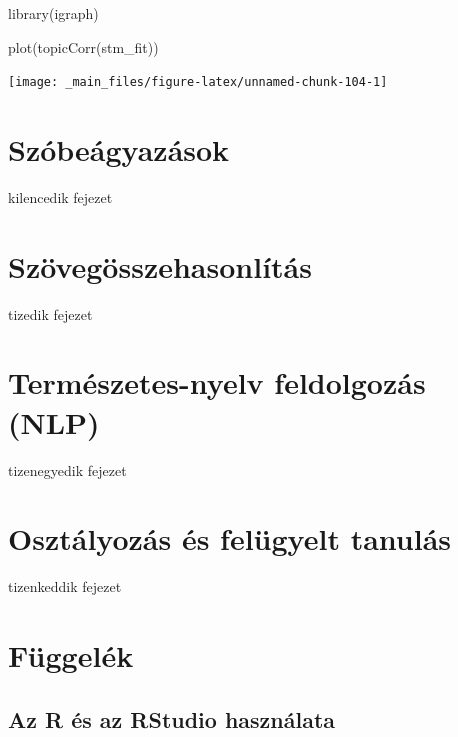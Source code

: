 \documentclass[
]{book}
\newenvironment{Shaded}{\begin{snugshade}}{\end{snugshade}}
\newcommand{\FunctionTok}[1]{\textcolor[rgb]{0.00,0.00,0.00}{#1}}
\newcommand{\NormalTok}[1]{#1}
\begin{document}
\begin{Shaded}
\begin{Highlighting}[]

\FunctionTok{library}\NormalTok{(igraph)}

\FunctionTok{plot}\NormalTok{(}\FunctionTok{topicCorr}\NormalTok{(stm\_fit))}
\end{Highlighting}
\end{Shaded}

\begin{center}\texttt{[image: \_main\_files/figure-latex/unnamed-chunk-104-1]} \end{center}

\hypertarget{szuxf3beuxe1gyazuxe1sok}{%
\chapter{Szóbeágyazások}\label{szuxf3beuxe1gyazuxe1sok}}

kilencedik fejezet

\hypertarget{szuxf6veguxf6sszehasonluxedtuxe1s}{%
\chapter{Szövegösszehasonlítás}\label{szuxf6veguxf6sszehasonluxedtuxe1s}}

tizedik fejezet

\hypertarget{termuxe9szetes-nyelv-feldolgozuxe1s-nlp}{%
\chapter{Természetes-nyelv feldolgozás
(NLP)}\label{termuxe9szetes-nyelv-feldolgozuxe1s-nlp}}

tizenegyedik fejezet

\hypertarget{osztuxe1lyozuxe1s-uxe9s-feluxfcgyelt-tanuluxe1s}{%
\chapter{Osztályozás és felügyelt
tanulás}\label{osztuxe1lyozuxe1s-uxe9s-feluxfcgyelt-tanuluxe1s}}

tizenkeddik fejezet

\hypertarget{fuxfcggeluxe9k}{%
\chapter{Függelék}\label{fuxfcggeluxe9k}}

\hypertarget{az-r-uxe9s-az-rstudio-hasznuxe1lata}{%
\section{Az R és az RStudio
használata}\label{az-r-uxe9s-az-rstudio-hasznuxe1lata}}
\end{document}
